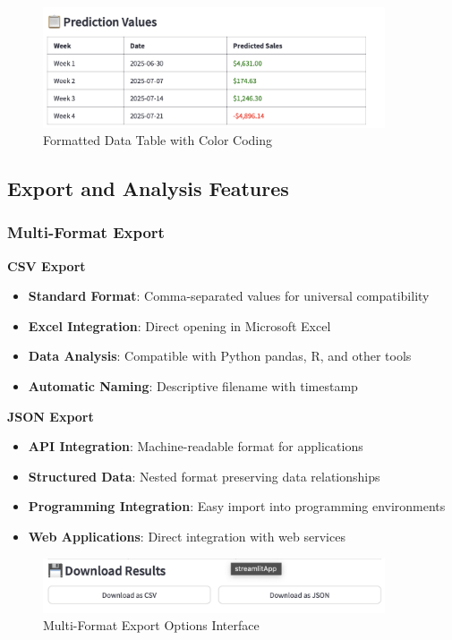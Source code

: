 \begin{figure}[H]
	\centering
	\includegraphics[width=0.9\textwidth]{Images/05ApplicationFunctionsAndFeatures/DataTablePresentation.png}
	\caption{Formatted Data Table with Color Coding}
	\label{fig:data_table_presentation}
\end{figure}

\subsection{Export and Analysis Features}

\subsubsection{Multi-Format Export}

\textbf{CSV Export}
\begin{itemize}
	\item \textbf{Standard Format}: Comma-separated values for universal compatibility
	\item \textbf{Excel Integration}: Direct opening in Microsoft Excel
	\item \textbf{Data Analysis}: Compatible with Python pandas, R, and other tools
	\item \textbf{Automatic Naming}: Descriptive filename with timestamp
\end{itemize}

\textbf{JSON Export}
\begin{itemize}
	\item \textbf{API Integration}: Machine-readable format for applications
	\item \textbf{Structured Data}: Nested format preserving data relationships
	\item \textbf{Programming Integration}: Easy import into programming environments
	\item \textbf{Web Applications}: Direct integration with web services
\end{itemize}

\begin{figure}[H]
	\centering
	\includegraphics[width=0.9\textwidth]{Images/05ApplicationFunctionsAndFeatures/ExportFormats.png}
	\caption{Multi-Format Export Options Interface}
	\label{fig:export_formats}
\end{figure}

